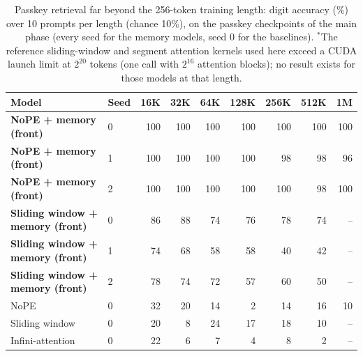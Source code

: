 \begin{table}\centering\small
\setlength{\tabcolsep}{4pt}
\begin{tabular}{llrrrrrrr}
\toprule
Model & Seed & 16K & 32K & 64K & 128K & 256K & 512K & 1M \\
\midrule
\textbf{NoPE + memory (front)} & 0 & 100 & 100 & 100 & 100 & 100 & 100 & 100 \\
\textbf{NoPE + memory (front)} & 1 & 100 & 100 & 100 & 100 & 98 & 98 & 96 \\
\textbf{NoPE + memory (front)} & 2 & 100 & 100 & 100 & 100 & 100 & 98 & 100 \\
\textbf{Sliding window + memory (front)} & 0 & 86 & 88 & 74 & 76 & 78 & 74 & --\rlap{$^\ast$} \\
\textbf{Sliding window + memory (front)} & 1 & 74 & 68 & 58 & 58 & 40 & 42 & --\rlap{$^\ast$} \\
\textbf{Sliding window + memory (front)} & 2 & 78 & 74 & 72 & 57 & 60 & 50 & --\rlap{$^\ast$} \\
NoPE & 0 & 32 & 20 & 14 & 2 & 14 & 16 & 10 \\
Sliding window & 0 & 20 & 8 & 24 & 17 & 18 & 10 & --\rlap{$^\ast$} \\
Infini-attention & 0 & 22 & 6 & 7 & 4 & 8 & 2 & --\rlap{$^\ast$} \\
\bottomrule
\end{tabular}
\caption{Passkey retrieval far beyond the 256-token training length: digit accuracy (\%) over 10 prompts per length (chance 10\%), on the passkey checkpoints of the main phase (every seed for the memory models, seed 0 for the baselines). $^\ast$The reference sliding-window and segment attention kernels used here exceed a CUDA launch limit at $2^{20}$ tokens (one call with $2^{16}$ attention blocks); no result exists for those models at that length.}
\label{tab:extreme}
\end{table}
